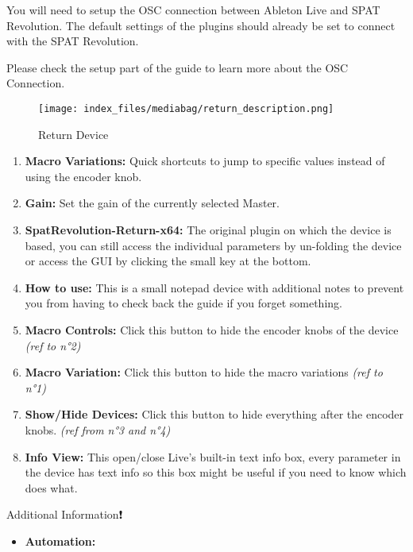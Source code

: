\documentclass[
  letterpaper,
  DIV=11,
  numbers=noendperiod]{scrreport}
\providecommand{\tightlist}{%
  \setlength{\itemsep}{0pt}\setlength{\parskip}{0pt}}\usepackage{longtable,booktabs,array}
\begin{document}
You will need to setup the OSC connection between Ableton Live and SPAT
Revolution. The default settings of the plugins should already be set to
connect with the SPAT Revolution.

Please check the setup part of the guide to learn more about the OSC
Connection.

\begin{figure}

{\centering \texttt{[image: index\_files/mediabag/return\_description.png]}

}

\caption{Return Device}

\end{figure}

\begin{enumerate}
\def\labelenumi{\arabic{enumi}.}
\tightlist
\item
  \textbf{Macro Variations:} Quick shortcuts to jump to specific values
  instead of using the encoder knob.
\item
  \textbf{Gain:} Set the gain of the currently selected Master.
\item
  \textbf{SpatRevolution-Return-x64:} The original plugin on which the
  device is based, you can still access the individual parameters by
  un-folding the device or access the GUI by clicking the small key at
  the bottom.
\item
  \textbf{How to use:} This is a small notepad device with additional
  notes to prevent you from having to check back the guide if you forget
  something.
\item
  \textbf{Macro Controls:} Click this button to hide the encoder knobs
  of the device \emph{(ref to n°2)}
\item
  \textbf{Macro Variation:} Click this button to hide the macro
  variations \emph{(ref to n°1)}
\item
  \textbf{Show/Hide Devices:} Click this button to hide everything after
  the encoder knobs. \emph{(ref from n°3 and n°4)}
\item
  \textbf{Info View:} This open/close Live's built-in text info box,
  every parameter in the device has text info so this box might be
  useful if you need to know which does what.
\end{enumerate}

Additional Information❗️

\begin{itemize}
\tightlist
\item
  \textbf{Automation:}
\end{itemize}
\end{document}
